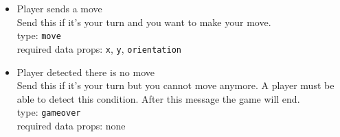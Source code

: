\documentclass{scrartcl}
\begin{document}
\begin{itemize}
\item Player sends a move \\
  Send this if it's your turn and you want to make your move. \\
  type: \texttt{move} \\
  required data props: \texttt{x}, \texttt{y}, \texttt{orientation}

\item Player detected there is no move \\
  Send this if it's your turn but you cannot move anymore. A player
  must be able to detect this condition. After this message the game
  will end. \\
  type: \texttt{gameover} \\
  required data props: none
\end{itemize}
\end{document}
